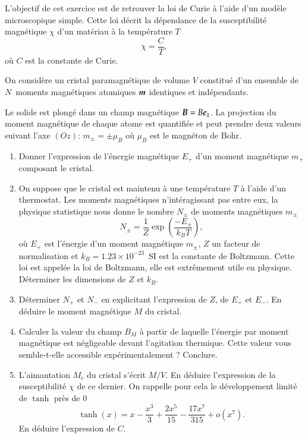 \begin{exocor}
	L'objectif de cet exercice est de retrouver la loi de Curie à l'aide
	d'un modèle microscopique simple. Cette loi décrit
	la dépendance de la susceptibilité magnétique $\chi$ d'un matériau à la température
	$T$
	\begin{equation*}
		\chi = \dfrac{C}{T},
	\end{equation*}
	où $C$ est la constante de Curie.

	On considère un cristal paramagnétique de volume $V$ constitué d'un ensemble
	de $N$~moments magnétiques atomiques $\vecm$ identiques et indépendants. 

	Le solide est plongé dans un champ magnétique $\vecb = B \ez$. La projection
	du moment magnétique de chaque atome est quantifiée et peut prendre deux
	valeurs suivant l'axe $(Oz)$: $m_\pm = \pm \mu_B$ où $\mu_B$ est le magnéton de
	Bohr.
	\begin{enumerate}
		\item Donner l'expression de l'énergie magnétique $E_+$ d'un moment
		  magnétique $m_+$ composant le cristal. 	
	  	\item On suppose que le cristal est maintenu à une température
		  $T$ à l'aide d'un thermostat. Les moments magnétiques 
		  n'intéragissant pas entre eux, la physique statistique
		  nous donne le nombre $N_\pm$ de moments magnétiques $m_\pm$
		  \begin{equation*}
			  N_\pm = \dfrac{1}{Z} \exp\left(\dfrac{-E_\pm}{k_B T}\right),
		  \end{equation*}
		  où $E_+$ est l'énergie d'un moment magnétique $m_\pm$,
		  $Z$ un facteur de normalisation et 
		  $k_B = 1.23 \times 10^{-23}$\, SI est la constante de Boltzmann.
		  Cette loi est appelée la loi de Boltzmann, elle est 
		  extrêmement utile en physique.
		  Déterminer les dimensions de $Z$ et $k_B$.
		
	  \item Déterminer $N_+$ et $N_-$ en explicitant l'expression de 
	    $Z$, de $E_+$ et $E_-$. En déduire le moment magnétique $M$ 
	    du cristal.
	  \item Calculer la valeur du champ $B_M$ à partir de laquelle l'énergie 
	    par moment magnétique est négligeable devant l'agitation thermique.
	    Cette valeur vous semble-t-elle accessible expérimentalement ?
	    Conclure.
	  \item L'aimantation $M_c$ du cristal s'écrit $M/V$. En déduire l'expression
	    de la susceptibilité $\chi$ de ce dernier.
	    On rappelle pour cela le développement
	    limité de $\tanh$ près de $0$
	    \begin{equation*}
		    \tanh(x) = x -\dfrac{x^3}{3} + \dfrac{2x^5}{15} - 
		    \dfrac{17x^7}{315}+ o(x^7).
	    \end{equation*}
	    En déduire l'expression de $C$.


\end{enumerate}
\end{exocor}
